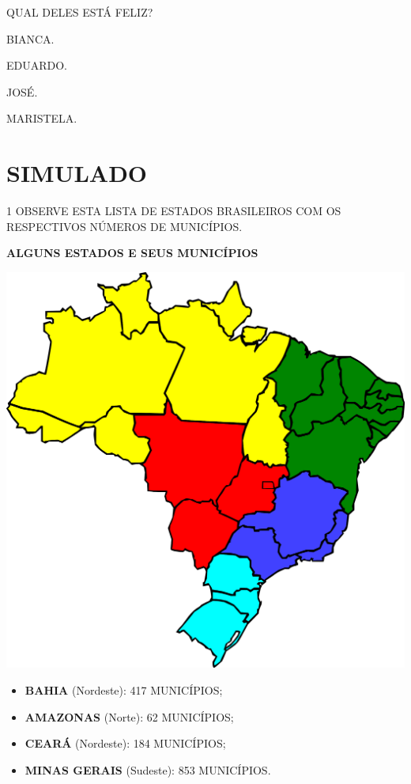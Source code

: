 QUAL DELES ESTÁ FELIZ?

\begin{multicols}{2}
\begin{escolha}%
\item BIANCA.

\item EDUARDO.

\item JOSÉ.

\item MARISTELA.
\end{escolha}
\end{multicols}


\chapter[SIMULADO 3]{SIMULADO}

\vspace*{-1cm}

\num{1} OBSERVE ESTA LISTA DE ESTADOS BRASILEIROS COM OS RESPECTIVOS NÚMEROS DE MUNICÍPIOS.

\begin{myquote}
\textbf{ALGUNS ESTADOS E SEUS MUNICÍPIOS}

\begin{center}
\includegraphics[width=.8\textwidth]{media/image120.png}
\end{center}

\begin{itemize}
  \item \textbf{BAHIA} (Nordeste): 417 MUNICÍPIOS;
  \item \textbf{AMAZONAS} (Norte): 62 MUNICÍPIOS;
  \item \textbf{CEARÁ} (Nordeste): 184 MUNICÍPIOS;
  \item \textbf{MINAS GERAIS} (Sudeste): 853 MUNICÍPIOS.
\end{itemize}
\end{myquote}


